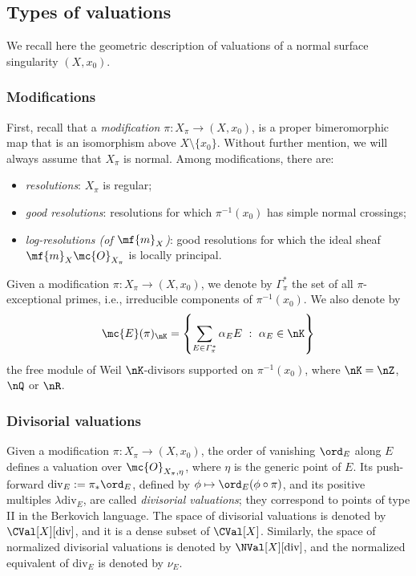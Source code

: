 \documentclass[11 pt, twoside, a4paper]{amsart}
\newcommand{\dgvert}[1]{\varGamma_{#1}^*}
\theoremstyle{definition}
\theoremstyle{definition}
\newcommand{\divi}{\mathrm{div}}
\newcommand{\Ediv}[2][]{\mc{E}(#2)_{#1}}
\begin{document}
\subsection{Types of valuations}\label{ssec:typesval}

We recall here the geometric description of valuations of a normal surface singularity $(X,x_0)$.

\subsubsection*{Modifications}

First, recall that a \emph{modification} $\pi \colon X_\pi \to (X,x_0)$, is a proper bimeromorphic map that is an isomorphism above $X \setminus \{x_0\}$.
Without further mention, we will always assume that $X_\pi$ is normal.
Among modifications, there are:
\begin{itemize}
\item \emph{resolutions}: $X_\pi$ is regular;
\item \emph{good resolutions}: resolutions for which $\pi^{-1}(x_0)$ has simple normal crossings;
\item \emph{log-resolutions (of $\mf{m}_X$)}: good resolutions for which the ideal sheaf $\mf{m}_X \mc{O}_{X_\pi}$ is locally principal.
\end{itemize}

Given a modification $\pi \colon X_\pi \to (X,x_0)$, we denote by $\dgvert{\pi}$ the set of all $\pi$-exceptional primes, i.e., irreducible components of $\pi^{-1}(x_0)$.
We also denote by
\[
\Ediv[\nK]{\pi}=\left\{\sum_{E \in \dgvert{\pi}} \alpha_E E\ :\ \alpha_E \in \nK\right\}
\] the free module of Weil $\nK$-divisors supported on $\pi^{-1}(x_0)$, where $\nK=\nZ$, $\nQ$ or $\nR$.

\subsubsection{Divisorial valuations}

Given a modification $\pi \colon X_\pi \to (X,x_0)$, the order of vanishing $\ord_E$ along $E$ defines a valuation over $\mc{O}_{X_\pi,\eta}$, where $\eta$ is the generic point of $E$.
Its push-forward $\divi_E := \pi_* \ord_E$, defined by $\phi \mapsto \ord_E(\phi \circ \pi)$, and its positive multiples $\lambda \divi_E$, are called \emph{divisorial valuations}; they correspond to points of type II in the Berkovich language.
The space of divisorial valuations is denoted by $\CVal[X][\mathrm{div}]$, and it is a dense subset of $\CVal[X]$. Similarly, the space of normalized divisorial valuations is denoted by $\NVal[X][\mathrm{div}]$, and the normalized equivalent of $\divi_E$ is denoted by $\nu_E$.
\end{document}
